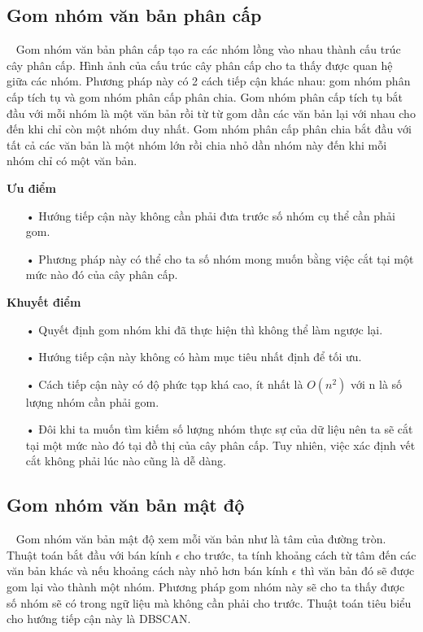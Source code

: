 \subsection{Gom nhóm văn bản phân cấp}
\label{sec:gnvbpc}
~\cite{hierarchical-clustering} Gom nhóm văn bản phân cấp tạo ra các nhóm lồng vào nhau thành cấu trúc cây phân cấp.
Hình ảnh của cấu trúc cây phân cấp cho ta thấy được quan hệ giữa các nhóm.
Phương pháp này có 2 cách tiếp cận khác nhau: gom nhóm phân cấp tích tụ  và gom nhóm phân cấp phân chia.
Gom nhóm phân cấp tích tụ bắt đầu với mỗi nhóm là một văn bản rồi từ từ gom dần các văn bản lại với nhau cho đến khi chỉ còn một nhóm duy nhất.
Gom nhóm phân cấp phân chia bắt đầu với tất cả các văn bản là một nhóm lớn rồi chia nhỏ dần nhóm này đến khi mỗi nhóm chỉ có một văn bản.

\textbf{Ưu điểm}
\begin{enumerate}
\item[•]Hướng tiếp cận này không cần phải đưa trước số nhóm cụ thể cần phải gom.
\item[•]Phương pháp này có thể cho ta số nhóm mong muốn bằng việc cắt tại một mức nào đó của cây phân cấp.
\end{enumerate}

\textbf{Khuyết điểm}
\begin{enumerate}
\item[•]Quyết định gom nhóm khi đã thực hiện thì không thể làm ngược lại.
\item[•]Hướng tiếp cận này không có hàm mục tiêu nhất định để tối ưu.
\item[•]Cách tiếp cận này có độ phức tạp khá cao, ít nhất là $O(n^2)$ với n là số lượng nhóm cần phải gom.
\item[•]Đôi khi ta muốn tìm kiếm số lượng nhóm thực sự của dữ liệu nên ta sẽ cắt tại một mức nào đó tại đồ thị của cây phân cấp.
Tuy nhiên, việc xác định vết cắt không phải lúc nào cũng là dễ dàng.
\end{enumerate}

\subsection{Gom nhóm văn bản mật độ} 
~\cite{Manojit-Nandi} Gom nhóm văn bản mật độ xem mỗi văn bản như là tâm của đường tròn.
Thuật toán bắt đầu với bán kính $\epsilon$ cho trước, ta tính khoảng cách từ tâm đến các văn bản khác và nếu khoảng cách này nhỏ hơn bán kính $\epsilon$ thì văn bản đó sẽ được gom lại vào thành một nhóm.
Phương pháp gom nhóm này sẽ cho ta thấy được số nhóm sẽ có trong ngữ liệu mà không cần phải cho trước.
Thuật toán tiêu biểu cho hướng tiếp cận này là DBSCAN.


